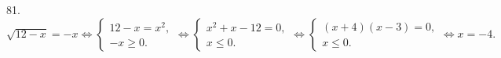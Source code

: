 81. $\sqrt{12-x}=-x\Leftrightarrow \begin{cases} 12-x=x^2,\\ -x\geqslant0.\end{cases}\Leftrightarrow \begin{cases} x^2+x-12=0,\\ x\leqslant0.\end{cases}
\Leftrightarrow \begin{cases} (x+4)(x-3)=0,\\ x\leqslant0.\end{cases}\Leftrightarrow x=-4.$\\
